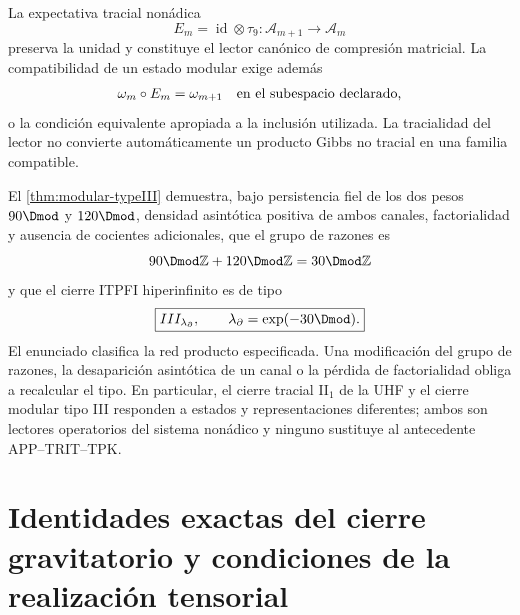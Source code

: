 La expectativa tracial non\'adica
\begin{equation}
 E_m=\operatorname{id}\otimes\tau_9:
 \mathcal A_{m+1}\longrightarrow\mathcal A_m
 \label{eq:rm-info-tracial-expectation}
\end{equation}
preserva la unidad y constituye el lector can\'onico de compresi\'on
matricial. La compatibilidad de un estado modular exige adem\'as
\begin{equation}
 \omega_m\circ E_m=\omega_{m+1}
 \quad\hbox{en el subespacio declarado,}
 \label{eq:rm-info-expectation-state}
\end{equation}
o la condici\'on equivalente apropiada a la inclusi\'on utilizada. La
tracialidad del lector no convierte autom\'aticamente un producto Gibbs no
tracial en una familia compatible.

El \cref{thm:modular-typeIII} demuestra, bajo persistencia fiel de los dos
pesos \(90\Dmod\) y \(120\Dmod\), densidad asint\'otica positiva de ambos
canales, factorialidad y ausencia de cocientes adicionales, que el grupo de
razones es
\begin{equation}
 90\Dmod\mathbb Z+120\Dmod\mathbb Z
 =30\Dmod\mathbb Z
 \label{eq:rm-info-ratio-group}
\end{equation}
y que el cierre ITPFI hiperinfinito es de tipo
\begin{equation}
 \boxed{
 III_{\lambda_\partial},
 \qquad
 \lambda_\partial=\exp(-30\Dmod).}
 \label{eq:rm-info-type-iii}
\end{equation}
El enunciado clasifica la red producto especificada. Una modificaci\'on del
grupo de razones, la desaparici\'on asint\'otica de un canal o la p\'erdida de
factorialidad obliga a recalcular el tipo. En particular, el cierre tracial
II\(_1\) de la UHF y el cierre modular tipo III responden a estados y
representaciones diferentes; ambos son lectores operatorios del sistema
non\'adico y ninguno sustituye al antecedente APP--TRIT--TPK.

\section{Identidades exactas del cierre gravitatorio y condiciones de la realización tensorial}

